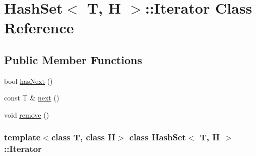 \hypertarget{class_hash_set_1_1_iterator}{
\section{HashSet$<$ T, H $>$::Iterator Class Reference}
\label{class_hash_set_1_1_iterator}
}
\subsection*{Public Member Functions}
\begin{DoxyCompactItemize}
\item 
bool \hyperlink{class_hash_set_1_1_iterator_a3054125b19a4ccab5f0aefb7944cf1a9}{hasNext} ()
\item 
const T \& \hyperlink{class_hash_set_1_1_iterator_a7b26734cd6b131511c7d35acc411c6ff}{next} ()
\item 
void \hyperlink{class_hash_set_1_1_iterator_ae1f3074c53d3dbda7ec5b9d804793aa2}{remove} ()
\end{DoxyCompactItemize}
\subsubsection*{template$<$class T, class H$>$ class HashSet$<$ T, H $>$::Iterator}



